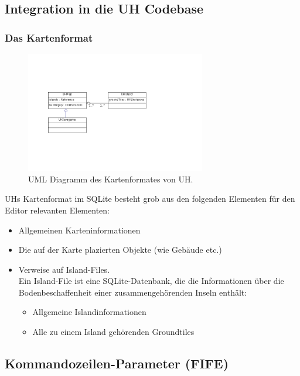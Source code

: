 \subsection{Integration in die UH Codebase}
\subsubsection{Das Kartenformat}
\label{kartenformat}

%
%
\begin{figure}[htbp]
  \centering
  
    \includegraphics[width=0.7\textwidth]{gfx/klassendiagramm-UHSaveGame.png}
  
  \caption{UML Diagramm des Kartenformates von UH.}
  \label{figure:automaton-intersection}
\end{figure}

UHs Kartenformat im SQLite besteht grob aus den folgenden Elementen für den
Editor relevanten Elementen:
\begin{itemize}
  \item Allgemeinen Karteninformationen
  \item Die auf der Karte plazierten Objekte (wie Gebäude etc.)
  \item Verweise auf Island-Files. \\ 
  Ein Island-File ist eine SQLite-Datenbank,
  die die Informationen über die Bodenbeschaffenheit einer zusammengehörenden
  Inseln enthält:
  \begin{itemize}
    \item Allgemeine Islandinformationen
    \item Alle zu einem Island gehörenden Groundtiles
  \end{itemize}
\end{itemize} 

\subsection{Kommandozeilen-Parameter (FIFE)}
